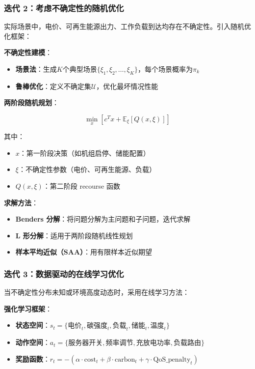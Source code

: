 \documentclass[12pt,a4paper]{article}
\begin{document}
\subsubsection{迭代 2：考虑不确定性的随机优化}

实际场景中，电价、可再生能源出力、工作负载到达均存在不确定性。引入随机优化框架：

\textbf{不确定性建模}：
\begin{itemize}
    \item \textbf{场景法}：生成$K$个典型场景$\{\xi_1, \xi_2, \ldots, \xi_K\}$，每个场景概率为$\pi_k$
    \item \textbf{鲁棒优化}：定义不确定集$\mathcal{U}$，优化最坏情况性能
\end{itemize}

\textbf{两阶段随机规划}：

\begin{equation}
\min_{x} \left[ c^T x + \mathbb{E}_{\xi} \left[ Q(x, \xi) \right] \right]
\label{eq:two-stage}
\end{equation}

其中：
\begin{itemize}
    \item $x$：第一阶段决策（如机组启停、储能配置）
    \item $\xi$：不确定性参数（电价、可再生能源、负载）
    \item $Q(x, \xi)$：第二阶段 recourse 函数
\end{itemize}

\textbf{求解方法}：
\begin{itemize}
    \item \textbf{Benders 分解}：将问题分解为主问题和子问题，迭代求解
    \item \textbf{L 形分解}：适用于两阶段随机线性规划
    \item \textbf{样本平均近似（SAA）}：用有限样本近似期望
\end{itemize}

\subsubsection{迭代 3：数据驱动的在线学习优化}

当不确定性分布未知或环境高度动态时，采用在线学习方法：

\textbf{强化学习框架}：

\begin{itemize}
    \item \textbf{状态空间}：$s_t = \{ \text{电价}_t, \text{碳强度}_t, \text{负载}_t, \text{储能}_t, \text{温度}_t \}$
    \item \textbf{动作空间}：$a_t = \{ \text{服务器开关}, \text{频率调节}, \text{充放电功率}, \text{负载路由} \}$
    \item \textbf{奖励函数}：$r_t = -(\alpha \cdot \text{cost}_t + \beta \cdot \text{carbon}_t + \gamma \cdot \text{QoS\_penalty}_t)$
\end{itemize}
\end{document}
